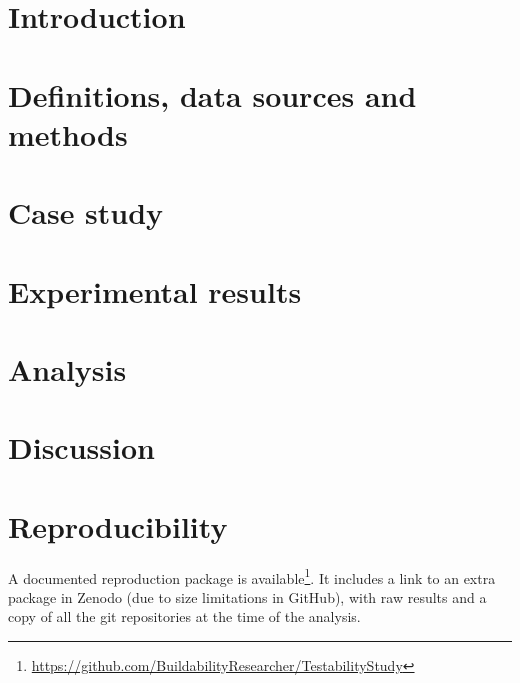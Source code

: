 \minitoc

\section{Introduction}
\label{sec:testability:intro}


\section{Definitions, data sources and methods}
\label{sec:testability:methodology}


\section{Case study}
\label{sec:testability:case-study}


\section{Experimental results}
\label{sec:testability:results}


\section{Analysis}
\label{sec:testability:analysis}


\section{Discussion}
\label{sec:testability:discussion}


% 

\section*{Reproducibility}
\label{sec:testability:repro}

A documented reproduction package is available\footnote{\url{https://github.com/BuildabilityResearcher/TestabilityStudy}}. 
It includes a link to an extra package in Zenodo (due to size limitations in GitHub), with raw results and a copy of all the git repositories at the time of the analysis.